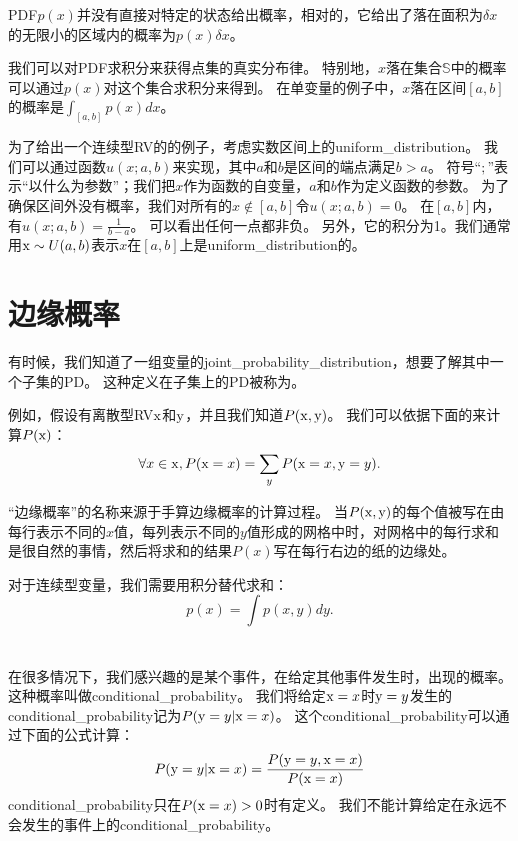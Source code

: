 \gls{PDF}$p(x)$并没有直接对特定的状态给出概率，相对的，它给出了落在面积为$\delta x$ 的无限小的区域内的概率为$p(x)\delta x$。

我们可以对\gls{PDF}求积分来获得点集的真实分布律。
特别地，$x$落在集合$\mathbb{S}$中的概率可以通过$p(x)$对这个集合求积分来得到。
在单变量的例子中，$x$落在区间$[a, b]$的概率是$\int_{[a,b]} p(x)dx$。

为了给出一个连续型\gls{RV}的的例子，考虑实数区间上的\gls{uniform_distribution}。
我们可以通过函数$u(x; a, b)$来实现，其中$a$和$b$是区间的端点满足$b>a$。
符号``$;$''表示``以什么为参数''；我们把$x$作为函数的自变量，$a$和$b$作为定义函数的参数。
为了确保区间外没有概率，我们对所有的$x\not\in[a,b]$令$u(x; a, b)=0$。
在$[a,b]$内，有$u(x; a, b)= \frac{1}{b-a}$。
可以看出任何一点都非负。
另外，它的积分为1。我们通常用$\mathrm{x} \sim U(a, b)$表示$x$在$[a, b]$上是\gls{uniform_distribution}的。

\section{边缘概率}
\label{sec:marginal_probability}

有时候，我们知道了一组变量的\gls{joint_probability_distribution}，想要了解其中一个子集的\gls{PD}。
这种定义在子集上的\gls{PD}被称为。

例如，假设有离散型\gls{RV}$\mathrm{x}$和$\mathrm{y}$，并且我们知道$P(\mathrm{x}, \mathrm{y})$。
我们可以依据下面的来计算$P(\mathrm{x})$：
\begin{equation}
\forall x \in \mathrm{x}, P(\mathrm{x} = x) = \sum_y P(\mathrm{x} = x, \mathrm{y} = y).
\end{equation}


``边缘概率''的名称来源于手算边缘概率的计算过程。
当$P(\mathrm{x}, \mathrm{y})$的每个值被写在由每行表示不同的$x$值，每列表示不同的$y$值形成的网格中时，对网格中的每行求和是很自然的事情，然后将求和的结果$P(x)$写在每行右边的纸的边缘处。

对于连续型变量，我们需要用积分替代求和：
\begin{equation}
p(x) = \int p(x, y)dy.
\end{equation}

\section{}
\label{sec:conditional_probability}

在很多情况下，我们感兴趣的是某个事件，在给定其他事件发生时，出现的概率。
这种概率叫做\gls{conditional_probability}。
我们将给定$\mathrm{x} = x$时$\mathrm{y} = y$发生的\gls{conditional_probability}记为$P(\mathrm{y} = y| \mathrm{x} =x)$。
这个\gls{conditional_probability}可以通过下面的公式计算：
\begin{equation}
P(\mathrm{y} = y| \mathrm{x} = x) = \frac{P(\mathrm{y} = y, \mathrm{x} = x)}{P(\mathrm{x} = x)}
\label{eq: 3.5}
\end{equation}
\gls{conditional_probability}只在$P(\mathrm{x} = x)>0$时有定义。
我们不能计算给定在永远不会发生的事件上的\gls{conditional_probability}。


